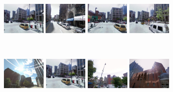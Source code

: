 \begin{figure}[h]
\begin{minipage}{0.34\linewidth}
      \end{minipage}
      \begin{minipage}{0.75\linewidth}
          \begin{minipage}{\linewidth} 
              \colorbox{myGreen}{\includegraphics[height=16mm]{imgs/ex3/FVsvm1.jpg}}
              \colorbox{myRed}{\includegraphics[height=16mm]{imgs/ex3/FVsvm2.jpg}}
              \colorbox{myGreen}{\includegraphics[height=16mm]{imgs/ex3/FVsvm5.jpg}}
              \colorbox{myGreen}{\includegraphics[height=16mm]{imgs/ex3/FVsvm4.jpg}}
          \end{minipage}
          \\
          \begin{minipage}{\linewidth}
              \colorbox{myRed}{\includegraphics[height=16mm]{imgs/ex3/FV1.jpg}}
              \colorbox{myGreen}{\includegraphics[height=16mm]{imgs/ex3/FV2.jpg}}
              \colorbox{myRed}{\includegraphics[height=16mm]{imgs/ex3/FV3.jpg}}
              \colorbox{myRed}{\includegraphics[height=16mm]{imgs/ex3/FV4.jpg}}

\end{minipage}
\end{minipage}
\end{figure}
